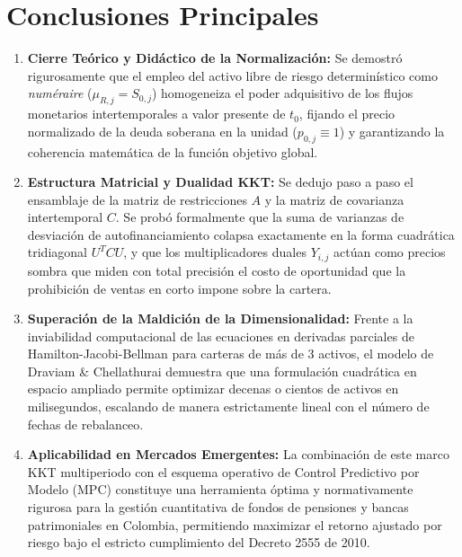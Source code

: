 \documentclass[11pt,a4paper]{report}
\numberwithin{equation}{chapter}
\begin{document}
\section{Conclusiones Principales}

\begin{enumerate}[leftmargin=2em]
    \item \textbf{Cierre Teórico y Didáctico de la Normalización:} Se demostró rigurosamente que el empleo del activo libre de riesgo determinístico como \emph{numéraire} ($\mu_{R,j} = S_{0,j}$) homogeneiza el poder adquisitivo de los flujos monetarios intertemporales a valor presente de $t_0$, fijando el precio normalizado de la deuda soberana en la unidad ($p_{0,j} \equiv 1$) y garantizando la coherencia matemática de la función objetivo global.
    
    \item \textbf{Estructura Matricial y Dualidad KKT:} Se dedujo paso a paso el ensamblaje de la matriz de restricciones $A$ y la matriz de covarianza intertemporal $C$. Se probó formalmente que la suma de varianzas de desviación de autofinanciamiento colapsa exactamente en la forma cuadrática tridiagonal $U^T C U$, y que los multiplicadores duales $Y_{i,j}$ actúan como precios sombra que miden con total precisión el costo de oportunidad que la prohibición de ventas en corto impone sobre la cartera.
    
    \item \textbf{Superación de la Maldición de la Dimensionalidad:} Frente a la inviabilidad computacional de las ecuaciones en derivadas parciales de Hamilton-Jacobi-Bellman para carteras de más de 3 activos, el modelo de Draviam \& Chellathurai demuestra que una formulación cuadrática en espacio ampliado permite optimizar decenas o cientos de activos en milisegundos, escalando de manera estrictamente lineal con el número de fechas de rebalanceo.
    
    \item \textbf{Aplicabilidad en Mercados Emergentes:} La combinación de este marco KKT multiperiodo con el esquema operativo de Control Predictivo por Modelo (MPC) constituye una herramienta óptima y normativamente rigurosa para la gestión cuantitativa de fondos de pensiones y bancas patrimoniales en Colombia, permitiendo maximizar el retorno ajustado por riesgo bajo el estricto cumplimiento del Decreto 2555 de 2010.
\end{enumerate}
\end{document}
